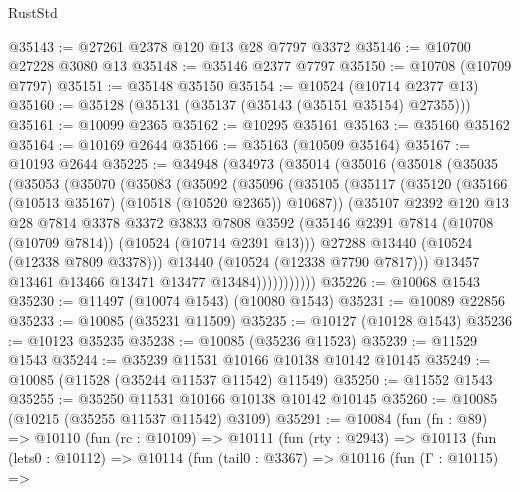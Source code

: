\begin{lexlean}{RustStd}
\begin{coremodule}
@35143 := @27261 @2378 @120 @13 @28 @7797 @3372
@35146 := @10700 @27228 @3080 @13
@35148 := @35146 @2377 @7797
@35150 := @10708 (@10709 @7797)
@35151 := @35148 @35150
@35154 := @10524 (@10714 @2377 @13)
@35160 := @35128 (@35131 (@35137 (@35143 (@35151 @35154) @27355)))
@35161 := @10099 @2365
@35162 := @10295 @35161
@35163 := @35160 @35162
@35164 := @10169 @2644
@35166 := @35163 (@10509 @35164)
@35167 := @10193 @2644
@35225 := @34948
    (@34973
      (@35014
        (@35016
          (@35018
            (@35035
              (@35053
                (@35070
                  (@35083
                    (@35092
                      (@35096
                        (@35105
                          (@35117
                            (@35120 (@35166 (@10513 @35167) (@10518 (@10520 @2365)) @10687))
                            (@35107
                              @2392
                              @120
                              @13
                              @28
                              @7814
                              @3378
                              @3372
                              @3833
                              @7808
                              @3592
                              (@35146
                                @2391
                                @7814
                                (@10708 (@10709 @7814))
                                (@10524 (@10714 @2391 @13)))
                              @27288
                              @13440
                              (@10524 (@12338 @7809 @3378)))
                            @13440
                            (@10524 (@12338 @7790 @7817)))
                          @13457
                          @13461
                          @13466
                          @13471
                          @13477
                          @13484)))))))))))
@35226 := @10068 @1543
@35230 := @11497 (@10074 @1543) (@10080 @1543)
@35231 := @10089 @22856
@35233 := @10085 (@35231 @11509)
@35235 := @10127 (@10128 @1543)
@35236 := @10123 @35235
@35238 := @10085 (@35236 @11523)
@35239 := @11529 @1543
@35244 := @35239 @11531 @10166 @10138 @10142 @10145
@35249 := @10085 (@11528 (@35244 @11537 @11542) @11549)
@35250 := @11552 @1543
@35255 := @35250 @11531 @10166 @10138 @10142 @10145
@35260 := @10085 (@10215 (@35255 @11537 @11542) @3109)
@35291 := @10084
    (fun (fn : @89) =>
    @10110
      (fun (rc : @10109) =>
      @10111
        (fun (rty : @2943) =>
        @10113
          (fun (lets0 : @10112) =>
          @10114
            (fun (tail0 : @3367) =>
            @10116
              (fun (Γ : @10115) =>

\end{coremodule}
\end{lexlean}
